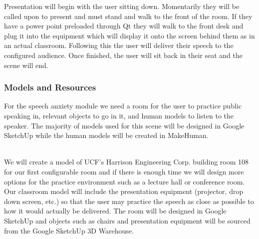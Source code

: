 \documentclass[a4paper,10pt]{article}
\begin{document}
Presentation will begin with the user sitting down. Momentarily they will be called upon to present and must stand and walk to the front of the room. If they have a power point preloaded through Qt they will walk to the front desk and plug it into the equipment which will display it onto the screen behind them as in an actual classroom. Following this the user will deliver their speech to the configured audience. Once finished, the user will sit back in their seat and the scene will end.

\subsubsection{Models and Resources}
For the speech anxiety module we need a room for the user to practice public speaking in, relevant objects to go in it, and human models to listen to the speaker. The majority of models used for this scene will be designed in Google SketchUp while the human models will be created in MakeHuman. 

\par~\\
We will create a model of UCF's Harrison Engineering Corp. building room 108 for our first configurable room and if there is enough time we will design more options for the practice environment such as a lecture hall or conference room. Our classroom model will include the presentation equipment (projector, drop down screen, etc.) so that the user may practice the speech as close as possible to how it would actually be delivered. The room will be designed in Google SketchUp and objects such as chairs and presentation equipment will be sourced from the Google SketchUp 3D Warehouse.
\end{document}
